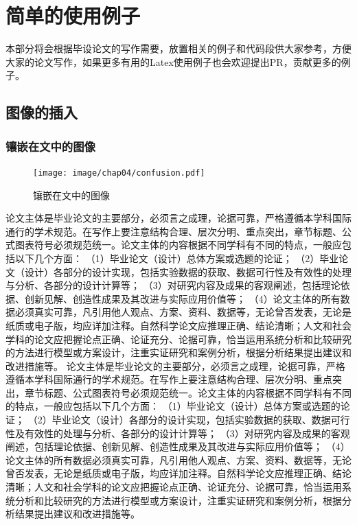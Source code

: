 \chapter{简单的使用例子}
\label{cha:usage-example}

本部分将会根据毕设论文的写作需要，放置相关的例子和代码段供大家参考，方便大家的论文写作，如果更多有用的Latex使用例子也会欢迎提出PR，贡献更多的例子。

\section{图像的插入}

\subsection{镶嵌在文中的图像}
\begin{figure}
	\centering
	\texttt{[image: image/chap04/confusion.pdf]}
	\caption{镶嵌在文中的图像}
	\label{fig:image-embedding-text}
\end{figure}
论文主体是毕业论文的主要部分，必须言之成理，论据可靠，严格遵循本学科国际通行的学术规范。在写作上要注意结构合理、层次分明、重点突出，章节标题、公式图表符号必须规范统一。论文主体的内容根据不同学科有不同的特点，一般应包括以下几个方面： （1）毕业论文（设计）总体方案或选题的论证； （2）毕业论文（设计）各部分的设计实现，包括实验数据的获取、数据可行性及有效性的处理与分析、各部分的设计计算等； （3）对研究内容及成果的客观阐述，包括理论依据、创新见解、创造性成果及其改进与实际应用价值等； （4）论文主体的所有数据必须真实可靠，凡引用他人观点、方案、资料、数据等，无论曾否发表，无论是纸质或电子版，均应详加注释。自然科学论文应推理正确、结论清晰；人文和社会学科的论文应把握论点正确、论证充分、论据可靠，恰当运用系统分析和比较研究的方法进行模型或方案设计，注重实证研究和案例分析，根据分析结果提出建议和改进措施等。
论文主体是毕业论文的主要部分，必须言之成理，论据可靠，严格遵循本学科国际通行的学术规范。在写作上要注意结构合理、层次分明、重点突出，章节标题、公式图表符号必须规范统一。论文主体的内容根据不同学科有不同的特点，一般应包括以下几个方面： （1）毕业论文（设计）总体方案或选题的论证； （2）毕业论文（设计）各部分的设计实现，包括实验数据的获取、数据可行性及有效性的处理与分析、各部分的设计计算等； （3）对研究内容及成果的客观阐述，包括理论依据、创新见解、创造性成果及其改进与实际应用价值等； （4）论文主体的所有数据必须真实可靠，凡引用他人观点、方案、资料、数据等，无论曾否发表，无论是纸质或电子版，均应详加注释。自然科学论文应推理正确、结论清晰；人文和社会学科的论文应把握论点正确、论证充分、论据可靠，恰当运用系统分析和比较研究的方法进行模型或方案设计，注重实证研究和案例分析，根据分析结果提出建议和改进措施等。



